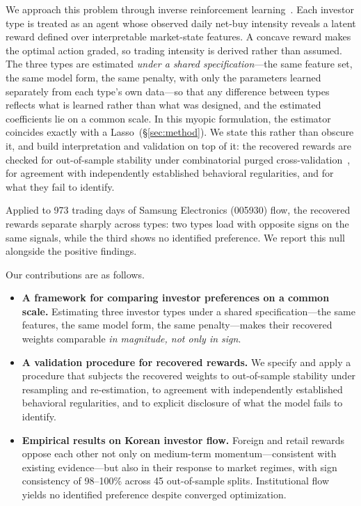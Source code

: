 \documentclass[sigconf,anonymous,review]{acmart}
\begin{document}
We approach this problem through inverse reinforcement
learning~\cite{ziebart2008}. Each investor type is treated as an agent
whose observed daily net-buy intensity reveals a latent reward defined
over interpretable market-state features. A concave reward makes the
optimal action graded, so trading intensity is derived rather than
assumed. The three types are estimated \emph{under a shared
specification}---the same feature set, the same model form, the same
penalty, with only the parameters learned separately from each type's own
data---so that any
difference between types reflects what is learned rather than what was
designed, and the estimated coefficients lie on a common scale. In this
myopic formulation, the estimator coincides exactly with a
Lasso~(\S\ref{sec:method}). We state this rather than obscure it, and
build interpretation and validation on top of it: the recovered rewards
are checked for out-of-sample stability under combinatorial purged
cross-validation~\cite{lopezdeprado2018}, for agreement with
independently established behavioral regularities, and for what they
fail to identify.

Applied to 973 trading days of Samsung Electronics (005930) flow, the
recovered rewards separate sharply across types: two types load with
opposite signs on the same signals, while the third shows no identified
preference. We report this null alongside the positive findings.

Our contributions are as follows.

\begin{itemize}
  \item \textbf{A framework for comparing investor preferences on a
    common scale.} Estimating three investor types under a shared
    specification---the same features, the same model form, the same
    penalty---makes their recovered weights comparable \emph{in
    magnitude, not only in sign}.
  \item \textbf{A validation procedure for recovered rewards.} We specify
    and apply a procedure that subjects the recovered weights to
    out-of-sample stability under resampling and re-estimation, to
    agreement with independently established behavioral regularities, and
    to explicit disclosure of what the model fails to identify.
  \item \textbf{Empirical results on Korean investor flow.} Foreign and
    retail rewards oppose each other not only on
    medium-term momentum---consistent with existing evidence---but also
    in their response to market regimes, with sign consistency of
    98--100\% across 45 out-of-sample splits. Institutional flow yields
    no identified preference despite converged optimization.
\end{itemize}
\end{document}
